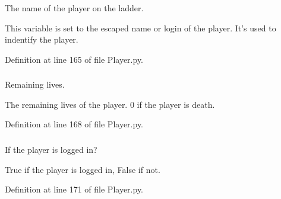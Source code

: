 The name of the player on the ladder. 

This variable is set to the escaped name or login of the player. It's used to indentify the player. 

Definition at line 165 of file Player.py.

\hypertarget{class_player_1_1_player_ade041c5e2ed4966a35e6d548746ee6da}{
\subsubsection[{\_\-\_\-lives}]{}}
\label{class_player_1_1_player_ade041c5e2ed4966a35e6d548746ee6da}


Remaining lives. 

The remaining lives of the player. 0 if the player is death. 

Definition at line 168 of file Player.py.

\hypertarget{class_player_1_1_player_a040c3c6e90a7655064aa65adbb4387b6}{
\subsubsection[{\_\-\_\-logged\_\-in}]{}}
\label{class_player_1_1_player_a040c3c6e90a7655064aa65adbb4387b6}


If the player is logged in? 

True if the player is logged in, False if not. 

Definition at line 171 of file Player.py.

\hypertarget{class_player_1_1_player_a11f44d16220129d7efca52828dc13d4f}{
\subsubsection[{\_\-\_\-old\_\-ladder\_\-name}]{}}
\label{class_player_1_1_player_a11f44d16220129d7efca52828dc13d4f}


